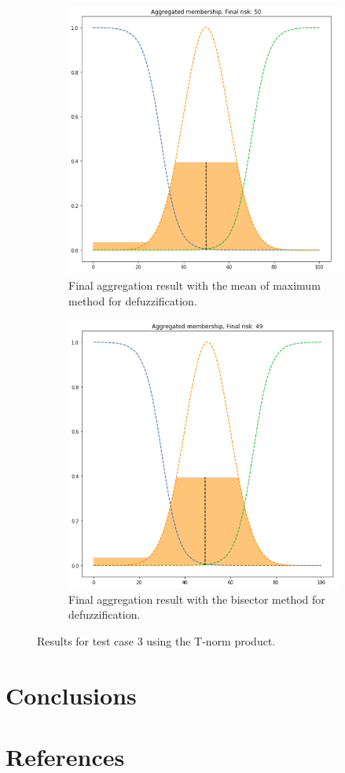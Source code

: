 \documentclass[conference]{IEEEtran}
\begin{document}
\begin{figure}[ht]
\begin{subfigure}{.5\textwidth}
  \centering
  \includegraphics[width=.8\linewidth]{figures/third/prod-mom.png}  
  \caption{Final aggregation result with the mean of maximum method for defuzzification.}
  \label{fig:3prod-mom}
\end{subfigure}
\begin{subfigure}{.5\textwidth}
  \centering
  \includegraphics[width=.8\linewidth]{figures/third/prod-bisector.png}  
  \caption{Final aggregation result with the bisector method for defuzzification.}
  \label{fig:3prod-bisector}
\end{subfigure}
\caption{Results for test case 3 using the T-norm product.}
\label{fig:testcase3prod}
\end{figure}

\section{Conclusions}

\section*{References}

\nocite{*}


\end{document}
